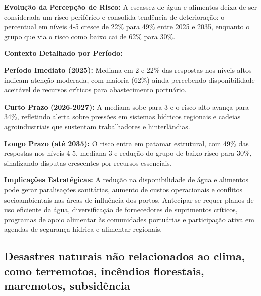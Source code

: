 \documentclass[
  portuguese,
  letterpaper,
  DIV=11,
  numbers=noendperiod]{scrreprt}
\begin{document}
\begin{tcolorbox}[enhanced jigsaw, breakable, leftrule=.75mm, opacitybacktitle=0.6, coltitle=black, rightrule=.15mm, colbacktitle=quarto-callout-tip-color!10!white, colframe=quarto-callout-tip-color-frame, titlerule=0mm, bottomtitle=1mm, colback=white, toprule=.15mm, toptitle=1mm, left=2mm, title=\textcolor{quarto-callout-tip-color}{\faLightbulb}\hspace{0.5em}{Destaques}, opacityback=0, bottomrule=.15mm, arc=.35mm]

\textbf{Evolução da Percepção de Risco:} A escassez de água e alimentos
deixa de ser considerada um risco periférico e consolida tendência de
deterioração: o percentual em níveis 4-5 cresce de 22\% para 49\% entre
2025 e 2035, enquanto o grupo que via o risco como baixo cai de 62\%
para 30\%.

\textbf{Contexto Detalhado por Período:}

\textbf{Período Imediato (2025):} Mediana em 2 e 22\% das respostas nos
níveis altos indicam atenção moderada, com maioria (62\%) ainda
percebendo disponibilidade aceitável de recursos críticos para
abastecimento portuário.

\textbf{Curto Prazo (2026-2027):} A mediana sobe para 3 e o risco alto
avança para 34\%, refletindo alerta sobre pressões em sistemas hídricos
regionais e cadeias agroindustriais que sustentam trabalhadores e
hinterlândias.

\textbf{Longo Prazo (até 2035):} O risco entra em patamar estrutural,
com 49\% das respostas nos níveis 4-5, mediana 3 e redução do grupo de
baixo risco para 30\%, sinalizando disputas crescentes por recursos
essenciais.

\textbf{Implicações Estratégicas:} A redução na disponibilidade de água
e alimentos pode gerar paralisações sanitárias, aumento de custos
operacionais e conflitos socioambientais nas áreas de influência dos
portos. Antecipar-se requer planos de uso eficiente da água,
diversificação de fornecedores de suprimentos críticos, programas de
apoio alimentar às comunidades portuárias e participação ativa em
agendas de segurança hídrica e alimentar regionais.

\end{tcolorbox}

\subsection{Desastres naturais não relacionados ao clima, como
terremotos, incêndios florestais, maremotos,
subsidência}\label{desastres-naturais-nuxe3o-relacionados-ao-clima-como-terremotos-incuxeandios-florestais-maremotos-subsiduxeancia}
\end{document}
